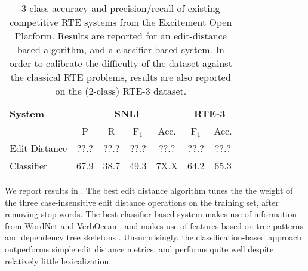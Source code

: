 %
%
\def\t#1{\small{#1}}
\def\b#1{\t{\textbf{#1}}}
\def\colspaceS{2.0mm}
\def\colspaceM{3.0mm}
\def\colspaceL{4.0mm}

\begin{table}
\begin{center}
\begin{tabular}{l@{\hskip \colspaceL}c@{\hskip \colspaceS}c@{\hskip \colspaceS}c@{\hskip \colspaceS}c@{\hskip \colspaceL}c@{\hskip \colspaceS}c}
\hline
\textbf{System} & \multicolumn{4}{c}{\b{SNLI}} & \multicolumn{2}{c}{\b{RTE-3}} \\
 & \t{P} & \t{R} & \t{F$_1$} & \t{Acc.} & \t{F$_1$} & \t{Acc.} \\
\hline
\t{Edit Distance} & \t{??.?} & \t{??.?} & \t{??.?} & \t{??.?} & 
                    \t{??.?} & \t{??.?} \\
\t{Classifier}    & \t{67.9} & \t{38.7} & \t{49.3} & \t{7X.X} & 
                    \t{64.2} & \t{65.3} \\
\hline
\end{tabular}
\end{center}
\caption{
\label{tab:eopresults}
3-class accuracy and precision/recall of existing competitive RTE
systems from the Excitement Open Platform.
Results are reported for an edit-distance based algorithm, and a
  classifier-based system.
In order to calibrate the difficulty of the dataset against the 
  classical RTE problems, results are also reported on the (2-class) 
  RTE-3 dataset.
}
\end{table}
%
%

We report results in .
The best edit distance algorithm tunes the the weight of the three 
  case-insensitive edit distance operations on the training set, 
  after removing stop words.
The best classifier-based system makes use of information from
  WordNet \cite{miller1995wordnet} and VerbOcean
  \cite{chklovski2004verbocean}, and makes use of features
  based on tree patterns and dependency tree skeletons
  \cite{wang2007recognizing}.
Unsurprisingly, the classification-based approach outperforms simple
  edit distance metrics, and performs quite well despite relatively
  little lexicalization.

%
%
